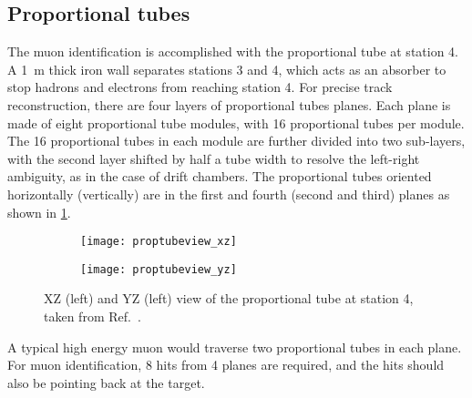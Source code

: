 \documentclass[../main.tex]{subfiles}
\begin{document}
\subsection{Proportional tubes}
The muon identification is accomplished with the proportional tube at station 4. A \SI{1}{\meter} thick
iron wall separates stations 3 and 4, which acts as an absorber to stop hadrons and electrons from reaching
station 4. For precise track reconstruction, there are four layers of proportional tubes planes. Each plane
is made of eight proportional tube modules, with 16 proportional tubes per module. The 16 proportional tubes
in each module are further divided into two sub-layers, with the second layer shifted by half a tube width to
resolve the left-right ambiguity, as in the case of drift chambers. The proportional tubes oriented horizontally
(vertically) are in the first and fourth (second and third) planes as shown in \cref{fig:prop}.
\begin{figure}[ht!]
	\centering
	\begin{subfigure}{0.45\linewidth}
		\texttt{[image: proptubeview\_xz]}
	\end{subfigure}
	\begin{subfigure}{0.45\linewidth}
		\texttt{[image: proptubeview\_yz]}
	\end{subfigure}
	\caption{XZ (left) and YZ (left) view of the proportional tube at station 4, taken from Ref.~\cite{aidala2019}.}
	\label{fig:prop}
\end{figure}
A typical high energy muon would traverse two proportional tubes in each plane.
For muon identification, 8 hits from 4 planes are required, and the hits
should also be pointing back at the target.
\end{document}
